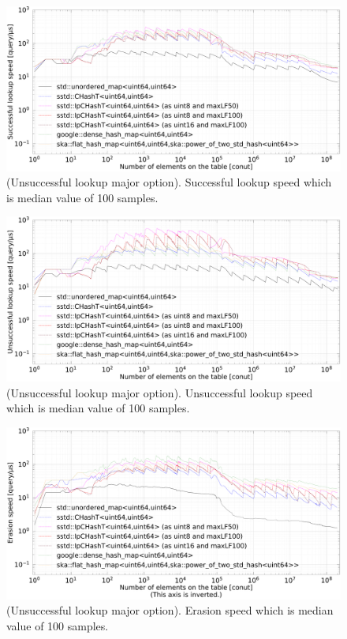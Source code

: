 \begin{figure}[h]
  \hspace{-3mm}
  \includegraphics[scale=0.24]{./fig_bench_usm/find_successful_lookup_med.pdf}
  \caption{
    (Unsuccessful lookup major option). Successful lookup speed which is median value of 100 samples.
  }
  \label{fig_bench_find_s_um}
\end{figure}

\begin{figure}[h]
  \hspace{-3mm}
  \includegraphics[scale=0.24]{./fig_bench_usm/find_unsuccessful_lookup_med.pdf}
  \caption{
    (Unsuccessful lookup major option). Unsuccessful lookup speed which is median value of 100 samples.
  }
  \label{fig_bench_find_us_um}
\end{figure}

\begin{figure}[h]
  \hspace{-3mm}
  \includegraphics[scale=0.24]{./fig_bench_usm/erase_med.pdf}
  \caption{
    (Unsuccessful lookup major option). Erasion speed which is median value of 100 samples.
  }
  \label{fig_bench_erase_um}
\end{figure}

